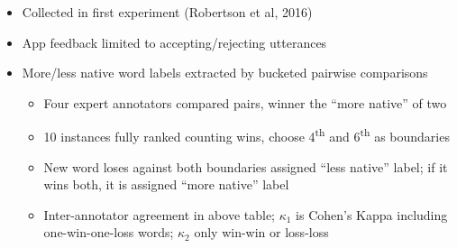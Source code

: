 \documentclass[
  gradient, landscape,
  style=bow,
  logo=figs/05_Uniligual_FullColour_Horizontal.eps,
]{utposter}
\begin{document}
\begin{columns}
{  \begin{itemize}
    \item Collected in first experiment (Robertson et al, 2016)
    \item App feedback limited to accepting/rejecting utterances
    \item More/less native word labels extracted by bucketed pairwise comparisons
          \begin{itemize}
            \item Four expert annotators compared pairs, winner the ``more
                  native'' of two
            \item 10 instances fully ranked counting wins, choose
                  4\textsuperscript{th} and 6\textsuperscript{th} as boundaries
            \item New word loses against both boundaries assigned ``less
                  native'' label; if it wins both, it is assigned ``more
                  native'' label
            \item Inter-annotator agreement in above table; $\kappa_1$ is
                  Cohen's Kappa including one-win-one-loss words; $\kappa_2$
                  only win-win or loss-loss
          \end{itemize}
  \end{itemize}
}

\end{columns}
\end{document}
